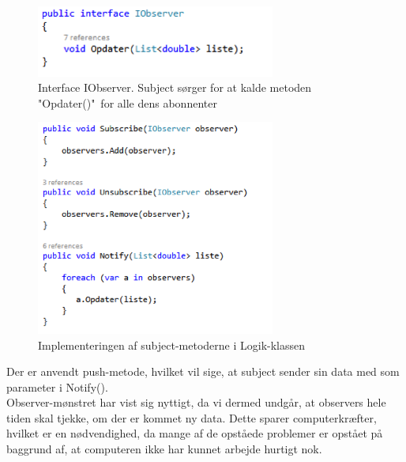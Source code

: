\begin{figure}[H]
	\centering
	\includegraphics[width=0.7\textwidth]{Figurer/SoftwareImplementering/observer2}
	\caption{Interface IObserver. Subject sørger for at kalde metoden "Opdater()"\ for alle dens abonnenter}
	\label{observer2}
\end{figure}

\begin{figure}[H]
	\centering
	\includegraphics[width=0.7\textwidth]{Figurer/SoftwareImplementering/observer3}
	\caption{Implementeringen af subject-metoderne i Logik-klassen}
	\label{observer3}
\end{figure}
Der er anvendt push-metode, hvilket vil sige, at subject sender sin data med som parameter i Notify().\\
Observer-mønstret har vist sig nyttigt, da vi dermed undgår, at observers hele tiden skal tjekke, om der er kommet ny data. Dette sparer computerkræfter, hvilket er en nødvendighed, da mange af de opståede problemer er opstået på baggrund af, at computeren ikke har kunnet arbejde hurtigt nok.

